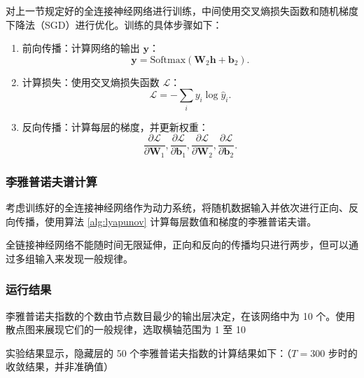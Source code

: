 对上一节规定好的全连接神经网络进行训练，中间使用交叉熵损失函数和随机梯度下降法（SGD）进行优化。训练的具体步骤如下：

\begin{enumerate}
  \item 前向传播：计算网络的输出 \(\mathbf{y}\)：
        \begin{equation}
          \mathbf{y} = \text{Softmax}(\mathbf{W}_2 \mathbf{h} + \mathbf{b}_2).
        \end{equation}
  \item 计算损失：使用交叉熵损失函数 \(\mathcal{L}\)：
        \begin{equation}
          \mathcal{L} = -\sum_{i} y_i \log \hat{y}_i.
        \end{equation}
  \item 反向传播：计算每层的梯度，并更新权重：
        \begin{equation}
          \frac{\partial \mathcal{L}}{\partial \mathbf{W}_1}, \frac{\partial \mathcal{L}}{\partial \mathbf{b}_1}, \frac{\partial \mathcal{L}}{\partial \mathbf{W}_2}, \frac{\partial \mathcal{L}}{\partial \mathbf{b}_2}.
        \end{equation}
\end{enumerate}

\subsubsection{李雅普诺夫谱计算}

考虑训练好的全连接神经网络作为动力系统，将随机数据输入并依次进行正向、反向传播，使用算法 \ref{alg:lyapunov} 计算每层数值和梯度的李雅普诺夫谱。

全链接神经网络不能随时间无限延伸，正向和反向的传播均只进行两步，但可以通过多组输入来发现一般规律。

\subsubsection{运行结果}

李雅普诺夫指数的个数由节点数目最少的输出层决定，在该网络中为 10 个。使用散点图来展现它们的一般规律，选取横轴范围为 1 至 10

实验结果显示，隐藏层的 50 个李雅普诺夫指数的计算结果如下：（$T = 300$ 步时的收敛结果，并非准确值）

